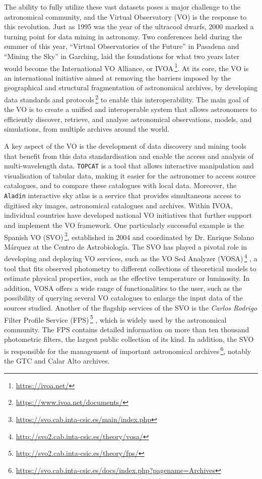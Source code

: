 The ability to fully utilize these vast datasets poses a major challenge to the astronomical community, and the Virtual Observatory (VO) is the response to this revolution. Just as 1995 was the year of the ultracool dwarfs, 2000 marked a turning point for data mining in astronomy. Two conferences held during the summer of this year, ``Virtual Observatories of the Future'' in Pasadena and ``Mining the Sky'' in Garching, laid the foundations for what two years later would become the International VO Alliance, or IVOA\,\footnote{\url{https://ivoa.net/}}. At its core, the VO is an international initiative aimed at removing the barriers imposed by the geographical and structural fragmentation of astronomical archives, by developing data standards and protocols\,\footnote{\url{https://www.ivoa.net/documents/}} to enable this interoperability. The main goal of the VO is to create a unified and interoperable system that allows astronomers to efficiently discover, retrieve, and analyse astronomical observations, models, and simulations, from multiple archives around the world.


A key aspect of the VO is the development of data discovery and mining tools that benefit from this data standardisation and enable the access and analysis of multi-wavelength data. \texttt{TOPCAT} \citep{Taylor2005} is a tool that allows interactive manipulation and visualisation of tabular data, making it easier for the astronomer to access source catalogues, and to compare these catalogues with local data. Moreover, the \texttt{Aladin} interactive sky atlas \citep{aladin} is a service that provides simultaneous access to digitised sky images, astronomical catalogues and archives. Within IVOA, individual countries have developed national VO initiatives that further support and implement the VO framework. One particularly successful example is the Spanish VO (SVO)\,\footnote{\url{https://svo.cab.inta-csic.es/main/index.php}}, established in 2004 and coordinated by Dr. Enrique Solano Márquez at the Centro de Astrobiología. The SVO has played a pivotal role in developing and deploying VO services, such as the VO Sed Analyzer (VOSA)\,\footnote{\url{http://svo2.cab.inta-csic.es/theory/vosa/}} \citep{vosa}, a tool that fits observed photometry to different collections of theoretical models to estimate physical properties, such as the effective temperature or luminosity. In addition, VOSA offers a wide range of functionalities to the user, such as the possibility of querying several VO catalogues to enlarge the input data of the sources studied. Another of the flagship services of the SVO is the \textit{Carlos Rodrigo} Filter Profile Service (FPS)\,\footnote{\url{http://svo2.cab.inta-csic.es/theory/fps/}} \citep{fps}, which is widely used by the astronomical community. The FPS contains detailed information on more than ten thousand photometric filters, the largest public collection of its kind. In addition, the SVO is responsible for the management of important astronomical archives\,\footnote{\url{https://svo.cab.inta-csic.es/docs/index.php?pagename=Archives}}, notably the GTC and Calar Alto archives.

